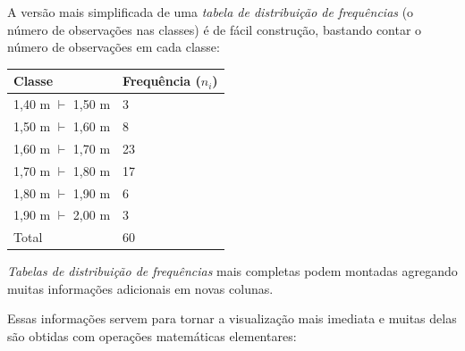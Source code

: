 \documentclass[
]{book}
\begin{document}
\hfill\break

A versão mais simplificada de uma \emph{tabela de distribuição de frequências} (o número de observações nas classes) é de fácil construção, bastando contar o número de observações em cada classe:

\hfill\break

\begin{longtable}[]{@{}ll@{}}
\toprule()
Classe & Frequência (\(n_{i}\)) \\
\midrule()
\endhead
1,40 m \(\vdash\) 1,50 m & 3 \\
1,50 m \(\vdash\) 1,60 m & 8 \\
1,60 m \(\vdash\) 1,70 m & 23 \\
1,70 m \(\vdash\) 1,80 m & 17 \\
1,80 m \(\vdash\) 1,90 m & 6 \\
1,90 m \(\vdash\) 2,00 m & 3 \\
Total & 60 \\
\bottomrule()
\end{longtable}

\hfill\break

\emph{Tabelas de distribuição de frequências} mais completas podem montadas agregando muitas informações adicionais em novas colunas.

Essas informações servem para tornar a visualização mais imediata e muitas delas são obtidas com operações matemáticas elementares:

\hfill\break
\end{document}
